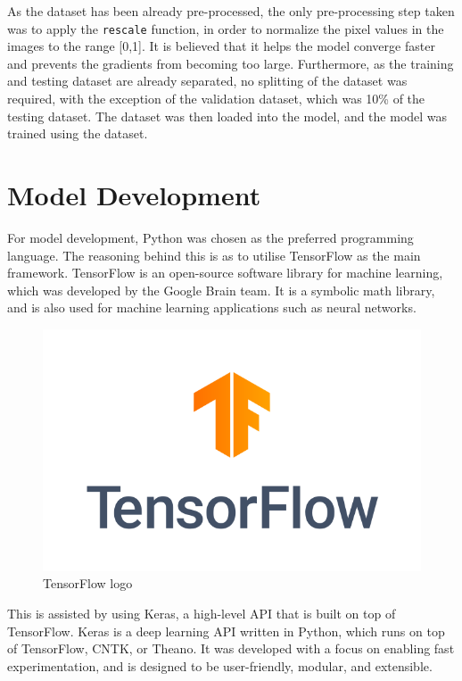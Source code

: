 As the dataset has been already pre-processed, the only pre-processing step taken was to apply the \texttt{rescale} function, in order to normalize the pixel values in the images to the range [0,1]. It is believed that it helps the model converge faster and prevents the gradients from becoming too large. Furthermore, as the training and testing dataset are already separated, no splitting of the dataset was required, with the exception of the validation dataset, which was 10\% of the testing dataset. The dataset was then loaded into the model, and the model was trained using the dataset.

\newpage
\section{Model Development}

For model development, Python was chosen as the preferred programming language. The reasoning behind this is as to utilise TensorFlow as the main framework. TensorFlow is an open-source software library for machine learning, which was developed by the Google Brain team. It is a symbolic math library, and is also used for machine learning applications such as neural networks. 

\begin{figure}[h]
    \centering
    \includegraphics[scale=0.3]{mainmatter/images/research methodology/tf_logo.png}
    \caption{TensorFlow logo}
    \label{fig:tensorflow}
\end{figure}

This is assisted by using Keras, a high-level API that is built on top of TensorFlow. Keras is a deep learning API written in Python, which runs on top of TensorFlow, CNTK, or Theano. It was developed with a focus on enabling fast experimentation, and is designed to be user-friendly, modular, and extensible.

